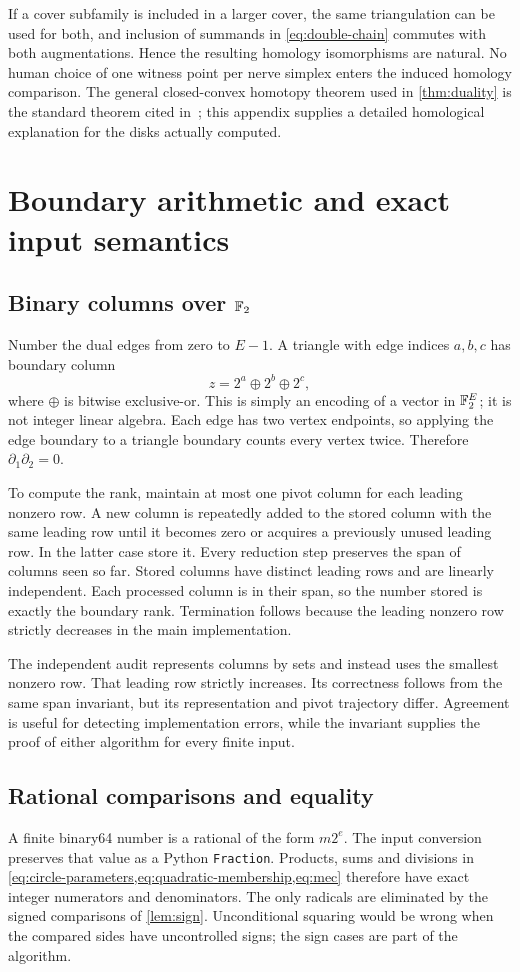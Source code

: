 If a cover subfamily is included in a larger cover, the same triangulation can be used for both, and inclusion of summands in \cref{eq:double-chain} commutes with both augmentations. Hence the resulting homology isomorphisms are natural. No human choice of one witness point per nerve simplex enters the induced homology comparison. The general closed-convex homotopy theorem used in \cref{thm:duality} is the standard theorem cited in~\cite{bauer}; this appendix supplies a detailed homological explanation for the disks actually computed.

\section{Boundary arithmetic and exact input semantics}
\label{app:arithmetic}
\subsection{Binary columns over \texorpdfstring{$\mathbb F_2$}{F2}}
Number the dual edges from zero to $E-1$. A triangle with edge indices $a,b,c$ has boundary column
\[
z=2^a\mathbin{\oplus}2^b\mathbin{\oplus}2^c,
\]
where $\oplus$ is bitwise exclusive-or. This is simply an encoding of a vector in $\mathbb F_2^E$; it is not integer linear algebra. Each edge has two vertex endpoints, so applying the edge boundary to a triangle boundary counts every vertex twice. Therefore $\partial_1\partial_2=0$.

To compute the rank, maintain at most one pivot column for each leading nonzero row. A new column is repeatedly added to the stored column with the same leading row until it becomes zero or acquires a previously unused leading row. In the latter case store it. Every reduction step preserves the span of columns seen so far. Stored columns have distinct leading rows and are linearly independent. Each processed column is in their span, so the number stored is exactly the boundary rank. Termination follows because the leading nonzero row strictly decreases in the main implementation.

The independent audit represents columns by sets and instead uses the smallest nonzero row. That leading row strictly increases. Its correctness follows from the same span invariant, but its representation and pivot trajectory differ. Agreement is useful for detecting implementation errors, while the invariant supplies the proof of either algorithm for every finite input.

\subsection{Rational comparisons and equality}
A finite binary64 number is a rational of the form $m2^e$. The input conversion preserves that value as a Python \texttt{Fraction}. Products, sums and divisions in \cref{eq:circle-parameters,eq:quadratic-membership,eq:mec} therefore have exact integer numerators and denominators. The only radicals are eliminated by the signed comparisons of \cref{lem:sign}. Unconditional squaring would be wrong when the compared sides have uncontrolled signs; the sign cases are part of the algorithm.

